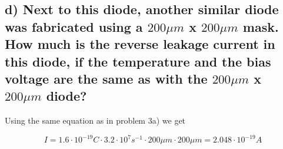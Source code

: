 \subsection*{d) Next to this diode, another similar diode was fabricated using a $200 \mu m$ x $200 \mu m$
mask. How much is the reverse leakage current in this diode, if the temperature
and the bias voltage are the same as with the $200 \mu m$ x $200 \mu m$ diode?}

Using the same equation as in problem 3a) we get

\begin{equation*}
    I=1.6 \cdot 10^{-19} C \cdot 3.2 \cdot 10^7 s^{-1} \cdot 200 \mu m \cdot 200 \mu m = 2.048\cdot 10^{-19} A
\end{equation*}

